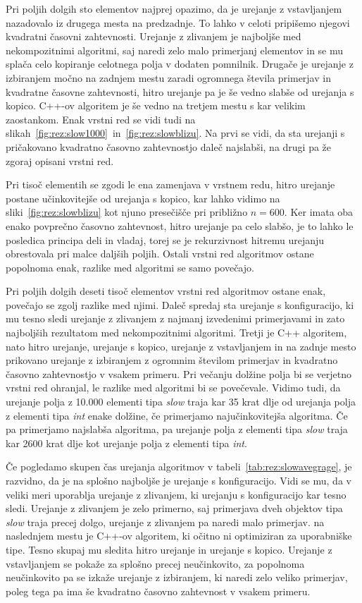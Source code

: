 \documentclass[a4paper,oneside,12pt]{article}
\begin{document}
Pri poljih dolgih sto elementov najprej opazimo, da je urejanje z vstavljanjem
nazadovalo iz drugega mesta na predzadnje. To lahko v celoti pripišemo njegovi
kvadratni časovni zahtevnosti. Urejanje z zlivanjem je najboljše med
nekompozitnimi algoritmi, saj naredi zelo malo primerjanj elementov in se mu
splača celo kopiranje celotnega polja v dodaten pomnilnik. Drugače je urejanje z
izbiranjem močno na zadnjem mestu zaradi ogromnega števila primerjav in
kvadratne časovne zahtevnosti, hitro urejanje pa je še vedno slabše od urejanja s
kopico. C++-ov algoritem je še vedno na tretjem mestu s kar velikim zaostankom.
Enak vrstni red se vidi tudi na
slikah~\ref{fig:rez:slow1000}~in~\ref{fig:rez:slowblizu}. Na prvi se vidi, da
sta urejanji s pričakovano kvadratno časovno zahtevnostjo daleč najslabši, na
drugi pa že zgoraj opisani vrstni red.

Pri tisoč elementih se zgodi le ena zamenjava v vrstnem redu, hitro urejanje
postane učinkovitejše od urejanja s kopico, kar lahko vidimo na
sliki~\ref{fig:rez:slowblizu} kot njuno presečišče pri približno $n = 600$.
Ker imata oba enako povprečno časovno zahtevnost, hitro urejanje pa celo slabšo, je to lahko le posledica
principa deli in vladaj, torej se je rekurzivnost hitremu urejanju obrestovala
pri malce daljših poljih. Ostali vrstni red algoritmov ostane popolnoma enak,
razlike med algoritmi se samo povečajo.

Pri poljih dolgih deseti tisoč elementov vrstni red algoritmov ostane enak,
povečajo se zgolj razlike med njimi. Daleč spredaj sta urejanje s konfiguracijo,
ki mu tesno sledi urejanje z zlivanjem z najmanj izvedenimi primerjavami in zato najboljših
rezultatom med nekompozitnimi algoritmi. Tretji je C++ algoritem, nato hitro urejanje,
urejanje s kopico, urejanje z vstavljanjem in na zadnje mesto prikovano urejanje z izbiranjem z
ogromnim številom primerjav in kvadratno časovno zahtevnostjo v vsakem primeru.
Pri večanju dolžine polja bi se verjetno vrstni red ohranjal, le razlike med
algoritmi bi se povečevale. Vidimo tudi, da urejanje polja z 10.000 elementi
tipa \emph{slow} traja kar 35 krat dlje od urejanja polja z elementi tipa
\emph{int} enake dolžine, če primerjamo najučinkovitejša algoritma. Če pa
primerjamo najslabša algoritma, pa urejanje polja z elementi tipa \emph{slow}
traja kar 2600 krat dlje kot urejanje polja z elementi tipa \emph{int}.

Če pogledamo skupen čas urejanja algoritmov v tabeli~\ref{tab:rez:slowavegrage},
je razvidno, da je na splošno najboljše je urejanje s konfiguracijo. Vidi se mu,
da v veliki meri
uporablja urejanje z zlivanjem, ki urejanju s konfiguracijo kar tesno sledi. 
Urejanje z zlivanjem je zelo primerno, saj primerjava dveh objektov tipa
\emph{slow} traja precej dolgo, urejanje z zlivanjem pa naredi malo primerjav.
na naslednjem mestu  je C++-ov  algoritem, ki očitno ni optimiziran za 
uporabniške tipe. Tesno skupaj mu sledita
hitro urejanje in urejanje s kopico. Urejanje z vstavljanjem se pokaže za
splošno precej neučinkovito, za popolnoma neučinkovito pa se izkaže urejanje z
izbiranjem, ki naredi zelo veliko primerjav, poleg tega pa ima še kvadratno
časovno zahtevnost v vsakem primeru.
\end{document}
